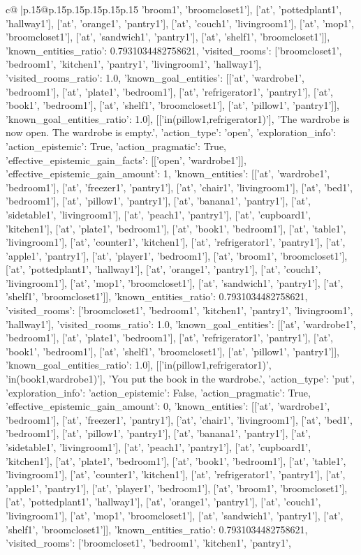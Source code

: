 \documentclass{article}
\begin{document}
{\begin{supertabular}{c@{$\;$}|p{.15\linewidth}@{}p{.15\linewidth}p{.15\linewidth}p{.15\linewidth}p{.15\linewidth}p{.15\linewidth}}
{{{'broom1', 'broomcloset1'], ['at', 'pottedplant1', 'hallway1'], ['at', 'orange1', 'pantry1'], ['at', 'couch1', 'livingroom1'], ['at', 'mop1', 'broomcloset1'], ['at', 'sandwich1', 'pantry1'], ['at', 'shelf1', 'broomcloset1']], 'known_entities_ratio': 0.7931034482758621, 'visited_rooms': ['broomcloset1', 'bedroom1', 'kitchen1', 'pantry1', 'livingroom1', 'hallway1'], 'visited_rooms_ratio': 1.0, 'known_goal_entities': [['at', 'wardrobe1', 'bedroom1'], ['at', 'plate1', 'bedroom1'], ['at', 'refrigerator1', 'pantry1'], ['at', 'book1', 'bedroom1'], ['at', 'shelf1', 'broomcloset1'], ['at', 'pillow1', 'pantry1']], 'known_goal_entities_ratio': 1.0}}], [['in(pillow1,refrigerator1)'], 'The wardrobe is now open. The wardrobe is empty.', {'action_type': 'open', 'exploration_info': {'action_epistemic': True, 'action_pragmatic': True, 'effective_epistemic_gain_facts': [['open', 'wardrobe1']], 'effective_epistemic_gain_amount': 1, 'known_entities': [['at', 'wardrobe1', 'bedroom1'], ['at', 'freezer1', 'pantry1'], ['at', 'chair1', 'livingroom1'], ['at', 'bed1', 'bedroom1'], ['at', 'pillow1', 'pantry1'], ['at', 'banana1', 'pantry1'], ['at', 'sidetable1', 'livingroom1'], ['at', 'peach1', 'pantry1'], ['at', 'cupboard1', 'kitchen1'], ['at', 'plate1', 'bedroom1'], ['at', 'book1', 'bedroom1'], ['at', 'table1', 'livingroom1'], ['at', 'counter1', 'kitchen1'], ['at', 'refrigerator1', 'pantry1'], ['at', 'apple1', 'pantry1'], ['at', 'player1', 'bedroom1'], ['at', 'broom1', 'broomcloset1'], ['at', 'pottedplant1', 'hallway1'], ['at', 'orange1', 'pantry1'], ['at', 'couch1', 'livingroom1'], ['at', 'mop1', 'broomcloset1'], ['at', 'sandwich1', 'pantry1'], ['at', 'shelf1', 'broomcloset1']], 'known_entities_ratio': 0.7931034482758621, 'visited_rooms': ['broomcloset1', 'bedroom1', 'kitchen1', 'pantry1', 'livingroom1', 'hallway1'], 'visited_rooms_ratio': 1.0, 'known_goal_entities': [['at', 'wardrobe1', 'bedroom1'], ['at', 'plate1', 'bedroom1'], ['at', 'refrigerator1', 'pantry1'], ['at', 'book1', 'bedroom1'], ['at', 'shelf1', 'broomcloset1'], ['at', 'pillow1', 'pantry1']], 'known_goal_entities_ratio': 1.0}}], [['in(pillow1,refrigerator1)', 'in(book1,wardrobe1)'], 'You put the book in the wardrobe.', {'action_type': 'put', 'exploration_info': {'action_epistemic': False, 'action_pragmatic': True, 'effective_epistemic_gain_amount': 0, 'known_entities': [['at', 'wardrobe1', 'bedroom1'], ['at', 'freezer1', 'pantry1'], ['at', 'chair1', 'livingroom1'], ['at', 'bed1', 'bedroom1'], ['at', 'pillow1', 'pantry1'], ['at', 'banana1', 'pantry1'], ['at', 'sidetable1', 'livingroom1'], ['at', 'peach1', 'pantry1'], ['at', 'cupboard1', 'kitchen1'], ['at', 'plate1', 'bedroom1'], ['at', 'book1', 'bedroom1'], ['at', 'table1', 'livingroom1'], ['at', 'counter1', 'kitchen1'], ['at', 'refrigerator1', 'pantry1'], ['at', 'apple1', 'pantry1'], ['at', 'player1', 'bedroom1'], ['at', 'broom1', 'broomcloset1'], ['at', 'pottedplant1', 'hallway1'], ['at', 'orange1', 'pantry1'], ['at', 'couch1', 'livingroom1'], ['at', 'mop1', 'broomcloset1'], ['at', 'sandwich1', 'pantry1'], ['at', 'shelf1', 'broomcloset1']], 'known_entities_ratio': 0.7931034482758621, 'visited_rooms': ['broomcloset1', 'bedroom1', 'kitchen1', 'pantry1', }}}
\end{supertabular}}
\end{document}
